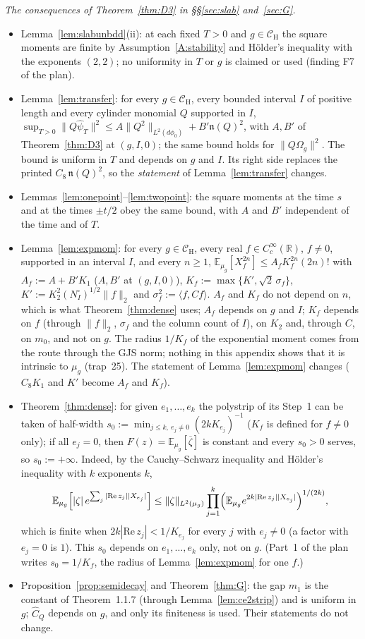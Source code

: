\documentclass[11pt,a4paper]{article}
\theoremstyle{plain}
\theoremstyle{definition}
\theoremstyle{plain}
\theoremstyle{definition}
\newcommand{\R}{\mathbb{R}}
\newcommand{\E}{\mathbb{E}}
\newcommand{\CH}{\mathcal{C}_{\mathrm H}}
\newcommand{\Om}{\Omega}
\newcommand{\ip}[2]{\langle #1,#2\rangle}
\begin{document}
\emph{The consequences of Theorem~\ref{thm:D3} in \S\S\ref{sec:slab} and~\ref{sec:G}.}
\begin{itemize}
\item Lemma~\ref{lem:slabunbdd}(ii): at each fixed $T>0$ and $g\in\CH$ the square moments
are finite by Assumption~\ref{A:stability} and H\"older's inequality with the exponents $(2,2)$; no
uniformity in $T$ or $g$ is claimed or used (finding F7 of the plan).
\item Lemma~\ref{lem:transfer}: for every $g\in\CH$, every bounded interval $I$ of positive
length and every cylinder monomial $Q$ supported in $I$,
$\sup_{T>0}\|Q\hat\psi_T\|^2\le A\|Q^2\|_{L^2(d\phi_0)}+B'\mathfrak n(Q)^2$, with $A,B'$ of
Theorem~\ref{thm:D3} at $(g,I,0)$; the same bound holds for $\|Q\Om_g\|^2$. The bound is
uniform in $T$ and depends on $g$ and $I$. Its right side replaces the printed
$C_8\,\mathfrak n(Q)^2$, so the \emph{statement} of Lemma~\ref{lem:transfer} changes.
\item Lemmas~\ref{lem:onepoint}--\ref{lem:twopoint}: the square moments at the time $s$ and at the
times $\pm t/2$ obey the same bound, with $A$ and $B'$ independent of the time and of $T$.
\item Lemma~\ref{lem:expmom}: for every $g\in\CH$, every real $f\in C_c^\infty(\R)$,
$f\ne0$, supported in an interval $I$, and every $n\ge1$,
$\E_{\mu_g}[X_f^{2n}]\le A_fK_f^{2n}(2n)!$ with $A_f:=A+B'K_1$ ($A,B'$ at $(g,I,0)$),
$K_f:=\max\{K',\sqrt2\,\sigma_f\}$, $K':=K_2^2(N^\square_I)^{1/2}\|f\|_2$ and
$\sigma_f^2:=\ip{f}{Cf}$. $A_f$ and $K_f$ do not depend on $n$, which is what Theorem~\ref{thm:dense} uses;
$A_f$ depends on $g$ and $I$; $K_f$ depends on $f$ (through $\|f\|_2$, $\sigma_f$ and the column
count of $I$), on $K_2$ and, through $C$, on $m_0$, and not on $g$. The radius $1/K_f$ of the
exponential moment comes from the route through the GJS norm; nothing in this appendix shows that it
is intrinsic to $\mu_g$ (trap~25). The statement of Lemma~\ref{lem:expmom} changes ($C_8K_1$ and $K'$
become $A_f$ and $K_f$).
\item Theorem~\ref{thm:dense}: for given $e_1,\dots,e_k$ the polystrip of its Step~1 can
be taken of half-width $s_0:=\min_{j\le k,\ e_j\ne0}(2kK_{e_j})^{-1}$ ($K_f$ is defined for
$f\ne0$ only); if all $e_j=0$, then $F(z)=\E_{\mu_g}[\overline\zeta]$ is constant and every
$s_0>0$ serves, so $s_0:=+\infty$.  Indeed, by the Cauchy--Schwarz inequality and H\"older's
inequality with $k$ exponents $k$,
\[
 \E_{\mu_g}\Bigl[|\zeta|\,e^{\sum_j|\mathrm{Re}\,z_j||X_{e_j}|}\Bigr]
 \le\|\zeta\|_{L^2(\mu_g)}\prod_{j=1}^k
 \Bigl(\E_{\mu_g}e^{2k|\mathrm{Re}\,z_j||X_{e_j}|}\Bigr)^{1/(2k)},
\]
which is finite when $2k|\mathrm{Re}\,z_j|<1/K_{e_j}$ for every $j$ with $e_j\ne0$ (a factor
with $e_j=0$ is $1$). This $s_0$ depends on $e_1,\dots,e_k$ only, not on $g$. (Part~1 of the plan writes $s_0=1/K_f$, the radius of Lemma~\ref{lem:expmom} for one $f$.)
\item Proposition~\ref{prop:semidecay} and Theorem~\ref{thm:G}: the gap $m_1$ is the constant of
Theorem~1.1.7 (through Lemma~\ref{lem:ce2strip}) and is uniform in $g$; $\widehat C_Q$ depends on $g$, and
only its finiteness is used. Their statements do not change.
\end{itemize}
\end{document}
